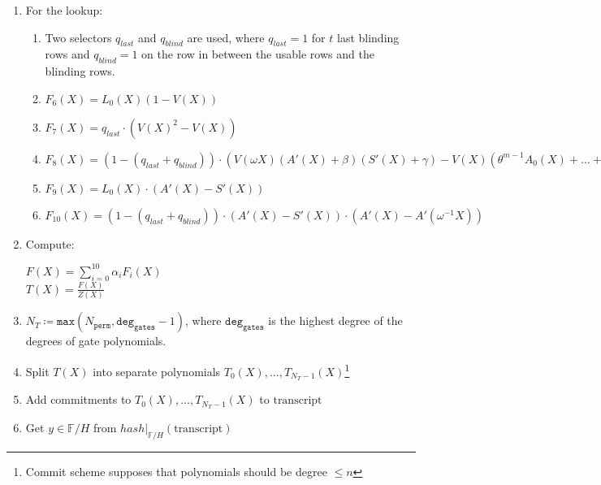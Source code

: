 \begin{enumerate}
\begin{center}
            $F_1(X) = L_1(X)(Q(X) - 1)$ \\
            $F_2(X) = P(X)p'(X) - P(X\omega)$ \\
            $F_3(X) = Q(X)q'(X) - Q(X\omega)$ \\
            $F_4(X) = L_n(X)(P(X\omega) - Q(X\omega))$ \\
            $F_5(X) = \sum\limits_{0 \leq i < N_{\texttt{sel}}} (\tau^i \cdot \textbf{q}_{i}(X) \cdot \texttt{gate}_i(X))
            + PI(X)$
        \end{center}
    \item For the lookup:
        \begin{enumerate}
            \item Two selectors $q_{last}$ and $q_{blind}$ are used, where $q_{last} = 1$ for $t$ last blinding rows and $q_{blind} = 1$ on the row in between the usable rows and the blinding rows.
            \item $F_6(X) = L_0(X) (1 - V(X))$
            \item $F_7(X) = q_{last} \cdot (V(X)^2 - V(X))$
            \item $F_8(X) = (1 - (q_{last} + q_{blind})) \cdot ( V(\omega X) (A'(X) + \beta) (S'(X) + \gamma) - V(X) (\theta^{m-1} A_0(X) + ... + A_{m-1}(X) + \beta) (\theta^{m-1} S_0(X) + ... + S_{m-1}(X) + \gamma) )$
            \item $F_9(X) = L_0(X) \cdot (A'(X) - S'(X))$
            \item $F_{10}(X) = (1 - (q_{last} + q_{blind})) \cdot (A'(X) - S'(X))\cdot(A'(X) - A'(\omega^{-1} X))$
        \end{enumerate}
    \item Compute:
        \begin{center}
            $F(X) = \sum\limits_{i = 0}^{10} \alpha_iF_i(X)$ \\
            $T(X) = \frac{F(X)}{Z(X)}$
        \end{center}
    \item $N_T \coloneqq \texttt{max}(N_{\texttt{perm}}, \texttt{deg}_{\texttt{gates}} - 1)$, 
		where $\texttt{deg}_{\texttt{gates}}$ is the highest degree of the degrees of gate polynomials. 
    \item Split $T(X)$ into separate polynomials $T_0(X), ..., T_{N_T - 1}(X)$\footnote{
    	Commit scheme supposes that polynomials should be degree $\leq n$}
    \item Add commitments to $T_0(X), ..., T_{N_T - 1}(X)$ to $\text{transcript}$
    \item Get $y \in \mathbb{F}/H$ from $hash|_{\mathbb{F}/H}(\text{transcript})$

\end{enumerate}
